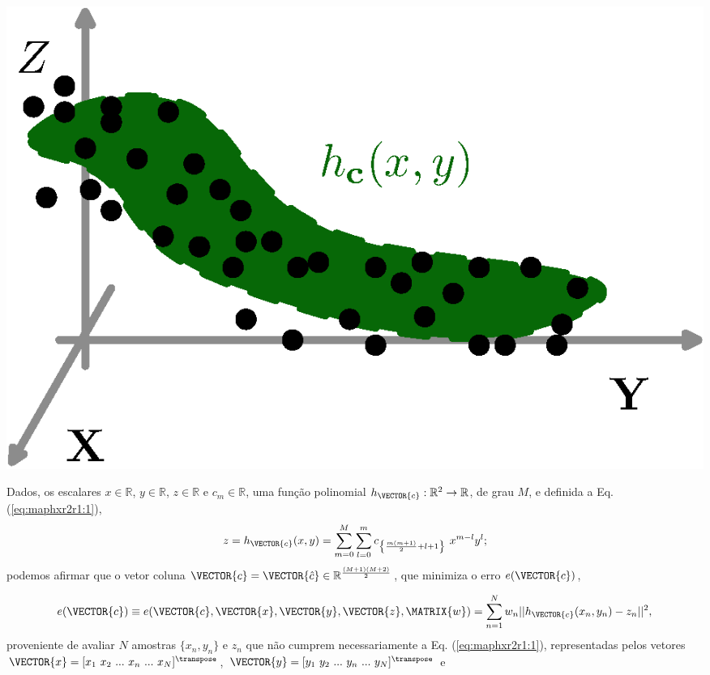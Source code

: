 \begin{theorem}
\label{theo:maphxr2r1}
~\\
\begin{minipage}{0.4\textwidth}
\centering
\includegraphics[width=0.95\linewidth]{chapters/mapeamento/mapeamento-hx2.eps} 
\end{minipage}
\begin{minipage}{0.6\textwidth}
Dados,
os escalares $x \in \mathbb{R}$, $y \in \mathbb{R}$, $z \in \mathbb{R}$ e $c_m \in \mathbb{R}$,
uma função polinomial $h_{\VECTOR{c}}:\mathbb{R}^2 \rightarrow \mathbb{R}$, de grau $M$, e 
definida a Eq. (\ref{eq:maphxr2r1:1}),
\begin{equation}\label{eq:maphxr2r1:1}
z= h_{\VECTOR{c}}(x,y) = \sum \limits_{m=0}^{M} \sum \limits_{l=0}^{m}c_{\left\{ \frac{m(m+1)}{2}+l+1\right\}}~x^{m-l}y^{l}; 
\end{equation}
podemos afirmar que o vetor coluna $\VECTOR{c}=\VECTOR{\hat{c}} \in \mathbb{R}^{\frac{(M+1)(M+2)}{2}}$,
que minimiza o erro $e(\VECTOR{c})$,
\end{minipage}
\begin{equation}\label{eq:maphxr2r1:2}
e(\VECTOR{c}) \equiv e(\VECTOR{c},\VECTOR{x},\VECTOR{y},\VECTOR{z},\MATRIX{w})=  \sum_{n=1}^{N} w_n||h_{\VECTOR{c}}(x_n,y_n)-z_n||^2,
\end{equation}
proveniente de avaliar $N$ amostras $\{x_n,y_n\}$ e $z_n$ que não cumprem necessariamente a Eq. (\ref{eq:maphxr2r1:1}), 
representadas pelos vetores 
$\VECTOR{x}=[x_1~ x_2~ ...~ x_n~ ...~ x_N]^{\transpose}$,
$\VECTOR{y}=[y_1~ y_2~ ...~ y_n~ ...~ y_N]^{\transpose}$ e 

\end{theorem}

